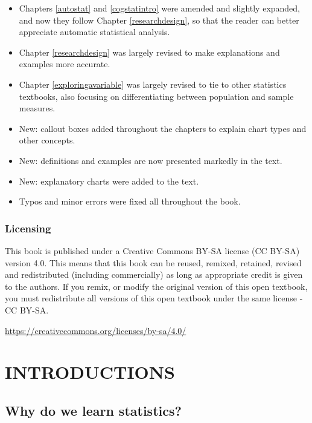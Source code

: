 \documentclass[
  11pt,
]{book}
\providecommand{\tightlist}{%
  \setlength{\itemsep}{0pt}\setlength{\parskip}{0pt}}
\theoremstyle{indenteddefinition}
\theoremstyle{indenteddefinition}
\theoremstyle{definition}
\theoremstyle{definition}
\theoremstyle{remark}
\begin{document}
\begin{itemize}
\tightlist
\item
  Chapters \ref{autostat} and \ref{cogstatintro} were amended and slightly expanded, and now they follow Chapter \ref{researchdesign}, so that the reader can better appreciate automatic statistical analysis.
\item
  Chapter \ref{researchdesign} was largely revised to make explanations and examples more accurate.
\item
  Chapter \ref{exploringavariable} was largely revised to tie to other statistics textbooks, also focusing on differentiating between population and sample measures.
\item
  New: callout boxes added throughout the chapters to explain chart types and other concepts.
\item
  New: definitions and examples are now presented markedly in the text.
\item
  New: explanatory charts were added to the text.
\item
  Typos and minor errors were fixed all throughout the book.
\end{itemize}

\hypertarget{licensing}{%
\section*{Licensing}\label{licensing}}

This book is published under a Creative Commons BY-SA license (CC BY-SA) version 4.0. This means that this book can be reused, remixed, retained, revised and redistributed (including commercially) as long as appropriate credit is given to the authors. If you remix, or modify the original version of this open textbook, you must redistribute all versions of this open textbook under the same license - CC BY-SA.

\url{https://creativecommons.org/licenses/by-sa/4.0/}

\hypertarget{part-introductions}{%
\part*{INTRODUCTIONS}\label{part-introductions}}

\hypertarget{whywhywhy}{%
\chapter{Why do we learn statistics?}\label{whywhywhy}}
\end{document}
